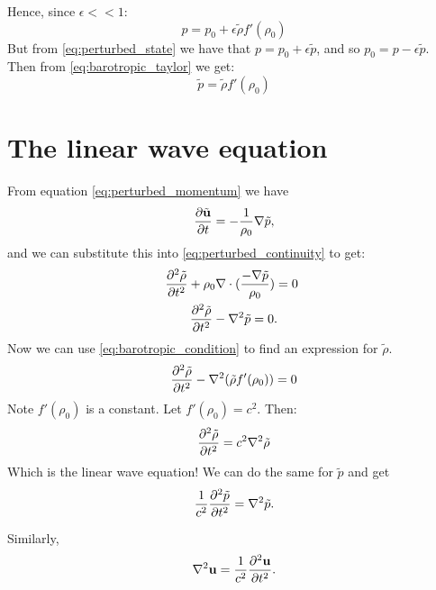 %
Hence, since $\epsilon << 1$:
    \begin{equation}\label{eq:barotropic_taylor}
        p = p_0 + \epsilon \tilde{\rho}f'(\rho_0)
    \end{equation}
%
But from \eqref{eq:perturbed_state} we have that $p = p_0 + \epsilon \tilde{p}$, and so $p_0 = p - \epsilon\tilde{p}$. Then from \eqref{eq:barotropic_taylor} we get:
    \begin{equation}\label{eq:barotropic_condition}
        \tilde{p} = \tilde{\rho} f'(\rho_0)
    \end{equation}
\section{The linear wave equation}\label{ss:lin_wave_eq}
From equation \eqref{eq:perturbed_momentum} we have
\begin{equation*}
    \frac{\partial \tilde{\mathbf{u}}}{\partial t} = - \frac{1}{\rho_0} \nabla \tilde{p}, 
\end{equation*}
and we can substitute this into \eqref{eq:perturbed_continuity} to get:
\begin{gather*}
    \frac{\partial ^2 \tilde{\rho}}{\partial t^2} 
    + \rho_0 \nabla \cdot ( \frac{- \nabla \tilde{p}}{\rho_0}) = 0 ~ \\ \frac{\partial ^2 \tilde{\rho}}{\partial t^2}
    - \nabla^2  \tilde{p} = 0.
\end{gather*}
Now we can use \ref{eq:barotropic_condition} to find an expression for $\tilde{\rho}$.
\begin{equation*}
    \frac{\partial ^2 \tilde{\rho}}{\partial t^2} - \nabla^2 (\tilde{\rho} f'(\rho_0)) = 0
\end{equation*}
Note $f'(\rho_0)$ is a constant. Let $f'(\rho_0) = c^2$. Then:
\begin{equation}
    \frac{\partial ^2 \tilde{\rho}}{\partial t^2} = c^2 \nabla^2 \tilde{\rho}
\end{equation}
Which is the linear wave equation! We can do the same for $\tilde{p}$ and get
    \begin{equation}
        \frac{1}{c^2}\frac{\partial ^2 \tilde{p}}{\partial t^2} = \nabla^2 \tilde{p}.
    \end{equation}\par
%
Similarly,
    \begin{equation}
        \nabla^2 \mathbf{u} = \frac{1}{c^2} \frac{\partial ^2 \mathbf{u}}{\partial t^2}.
    \end{equation} \par
